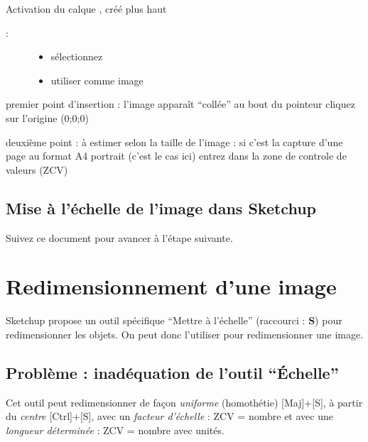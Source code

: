 \documentclass[a4paper,12pt,french]{sphinxmanual}
\begin{document}
Activation du calque , créé plus haut {\hyperref[su/import\string-ssqu:creation\string-calques\string-su\string-debut]{}}
\begin{description}
\item[{ :}] \leavevmode\begin{itemize}
\item {} 
sélectionnez 

\item {} 
utiliser comme image

\end{itemize}

\end{description}

premier point d'insertion : l'image apparaît ``collée'' au bout du pointeur cliquez sur l'origine (0;0;0)

deuxième point : à estimer selon la taille de l'image : si c'est la capture d'une page au format A4 portrait (c'est le cas ici) entrez \sphinxcode{20cm} dans la zone de controle de valeurs (ZCV)


\subsection{Mise à l'échelle de l'image dans Sketchup}
\label{su/import-ssqu:mise-a-l-echelle-de-l-image-dans-sketchup}
Suivez ce document {\hyperref[su/redimensionnement\string-images\string-outil\string-mesure::doc]{}} pour avancer à l'étape suivante.


\section{Redimensionnement d'une image}
\label{su/redimensionnement-images-outil-mesure:redimensionnement-images-outil-mesure}\label{su/redimensionnement-images-outil-mesure::doc}\label{su/redimensionnement-images-outil-mesure:redimensionnement-d-une-image}
Sketchup propose un outil spécifique ``Mettre à l'échelle'' (raccourci : \textbf{S}) pour redimensionner les objets. On peut donc l'utiliser pour redimensionner une image.


\subsection{Problème  : inadéquation de l'outil ``Échelle''}
\label{su/redimensionnement-images-outil-mesure:probleme-inadequation-de-l-outil-echelle}
Cet outil peut redimensionner de façon \emph{uniforme} (homothétie) {[}Maj{]}+{[}S{]}, à partir du \emph{centre} {[}Ctrl{]}+{[}S{]}, avec un \emph{facteur d'échelle} : ZCV = nombre et avec une \emph{longueur déterminée} : ZCV = nombre avec unités.
\end{document}
